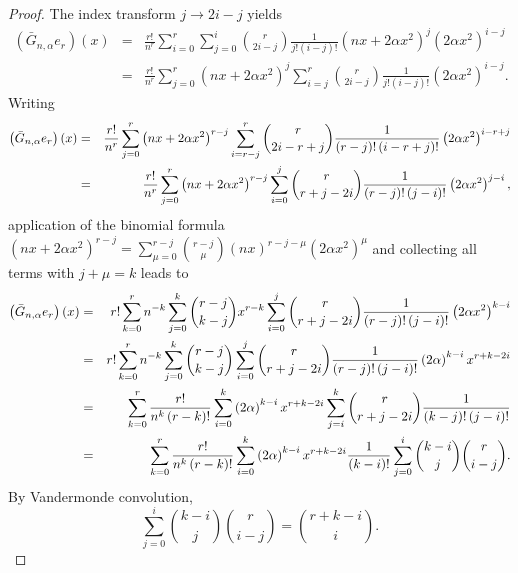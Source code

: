 \documentclass[10pt,a4paper]{amsart}
\begin{document}
\begin{proof}
The index transform $j\rightarrow 2i-j$ yields 
\begin{eqnarray*}
\left( \bar{G}_{n,\alpha }e_{r}\right) \left( x\right) &=&\frac{r!}{n^{r}}%
\sum_{i=0}^{r}\sum_{j=0}^{i}\binom{r}{2i-j}\frac{1}{j!\left( i-j\right) !}%
\left( nx+2\alpha x^{2}\right) ^{j}\left( 2\alpha x^{2}\right) ^{i-j} \\
&=&\frac{r!}{n^{r}}\sum_{j=0}^{r}\left( nx+2\alpha x^{2}\right)
^{j}\sum_{i=j}^{r}\binom{r}{2i-j}\frac{1}{j!\left( i-j\right) !}\left(
2\alpha x^{2}\right) ^{i-j}.
\end{eqnarray*}%
Writing 
\begin{eqnarray*}
\left( \bar{G}_{n,\alpha }e_{r}\right) \left( x\right) &=&\frac{r!}{n^{r}}%
\sum_{j=0}^{r}\left( nx+2\alpha x^{2}\right) ^{r-j}\sum_{i=r-j}^{r}\binom{r}{%
2i-r+j}\frac{1}{\left( r-j\right) !\left( i-r+j\right) !}\left( 2\alpha
x^{2}\right) ^{i-r+j} \\
&=&\frac{r!}{n^{r}}\sum_{j=0}^{r}\left( nx+2\alpha x^{2}\right)
^{r-j}\sum_{i=0}^{j}\binom{r}{r+j-2i}\frac{1}{\left( r-j\right) !\left(
j-i\right) !}\left( 2\alpha x^{2}\right) ^{j-i},
\end{eqnarray*}%
application of the binomial formula $\left( nx+2\alpha x^{2}\right)
^{r-j}=\sum_{\mu =0}^{r-j}\binom{r-j}{\mu }\left( nx\right) ^{r-j-\mu
}\left( 2\alpha x^{2}\right) ^{\mu }$ and collecting all terms with $j+\mu
=k $ leads to 
\begin{eqnarray*}
\left( \bar{G}_{n,\alpha }e_{r}\right) \left( x\right)
&=&r!\sum_{k=0}^{r}n^{-k}\sum_{j=0}^{k}\binom{r-j}{k-j}x^{r-k}\sum_{i=0}^{j}%
\binom{r}{r+j-2i}\frac{1}{\left( r-j\right) !\left( j-i\right) !}\left(
2\alpha x^{2}\right) ^{k-i} \\
&=&r!\sum_{k=0}^{r}n^{-k}\sum_{j=0}^{k}\binom{r-j}{k-j}\sum_{i=0}^{j}\binom{r%
}{r+j-2i}\frac{1}{\left( r-j\right) !\left( j-i\right) !}\left( 2\alpha
\right) ^{k-i}x^{r+k-2i} \\
&=&\sum_{k=0}^{r}\frac{r!}{n^{k}\left( r-k\right) !}\sum_{i=0}^{k}\left(
2\alpha \right) ^{k-i}x^{r+k-2i}\sum_{j=i}^{k}\binom{r}{r+j-2i}\frac{1}{%
\left( k-j\right) !\left( j-i\right) !} \\
&=&\sum_{k=0}^{r}\frac{r!}{n^{k}\left( r-k\right) !}\sum_{i=0}^{k}\left(
2\alpha \right) ^{k-i}x^{r+k-2i}\frac{1}{\left( k-i\right) !}\sum_{j=0}^{i}%
\binom{k-i}{j}\binom{r}{i-j}.
\end{eqnarray*}%
By Vandermonde convolution, 
\begin{equation*}
\sum_{j=0}^{i}\binom{k-i}{j}\binom{r}{i-j}=\binom{r+k-i}{i}.
\end{equation*}%

\end{proof}
\end{document}
